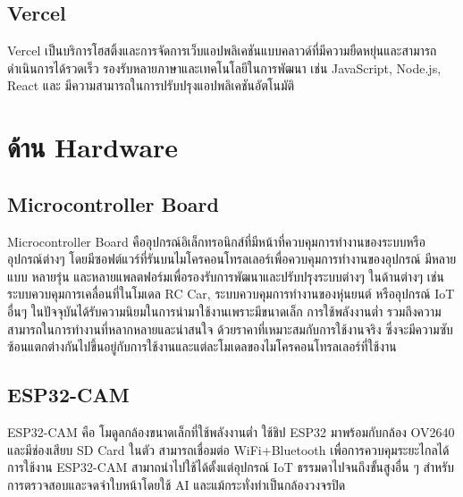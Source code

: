 \subsection{Vercel}
Vercel เป็นบริการโฮสติ้งและการจัดการเว็บแอปพลิเคชันแบบคลาวด์ที่มีความยืดหยุ่นและสามารถดำเนินการได้รวดเร็ว รองรับหลายภาษาและเทคโนโลยีในการพัฒนา เช่น JavaScript, Node.js, React และ มีความสามารถในการปรับปรุงแอปพลิเคชันอัตโนมัติ

\section{ด้าน Hardware}

\subsection{Microcontroller Board}
Microcontroller Board คืออุปกรณ์อิเล็กทรอนิกส์ที่มีหน้าที่ควบคุมการทำงานของระบบหรืออุปกรณ์ต่างๆ โดยมีซอฟต์แวร์ที่รันบนไมโครคอนโทรลเลอร์เพื่อควบคุมการทำงานของอุปกรณ์ มีหลายแบบ หลายรุ่น และหลายแพลตฟอร์มเพื่อรองรับการพัฒนาและปรับปรุงระบบต่างๆ ในด้านต่างๆ เช่น ระบบควบคุมการเคลื่อนที่ในโมเดล RC Car, 
ระบบควบคุมการทำงานของหุ่นยนต์ หรืออุปกรณ์ IoT อื่นๆ ในปัจจุบันได้รับความนิยมในการนำมาใช้งานเพราะมีขนาดเล็ก การใช้พลังงานต่ำ รวมถึงความสามารถในการทำงานที่หลากหลายและน่าสนใจ ด้วยราคาที่เหมาะสมกับการใช้งานจริง ซึ่งจะมีความซับซ้อนแตกต่างกันไปขึ้นอยู่กับการใช้งานและแต่ละโมเดลของไมโครคอนโทรลเลอร์ที่ใช้งาน\cite{Micro}

\subsection{ESP32-CAM}
ESP32-CAM คือ โมดูลกล้องขนาดเล็กที่ใช้พลังงานต่ำ ใช้ชิป ESP32 มาพร้อมกับกล้อง OV2640 และมีช่องเสียบ SD Card ในตัว สามารถเชื่อมต่อ WiFi+Bluetooth เพื่อการควบคุมระยะไกลได้ 
การใช้งาน ESP32-CAM สามาถนำไปใช้ได้ตั้งแต่อุปกรณ์ IoT ธรรมดาไปจนถึงขั้นสูงอื่น ๆ สำหรับการตรวจสอบและจดจำใบหน้าโดยใช้ AI และแม้กระทั่งทำเป็นกล้องวงจรปิด





